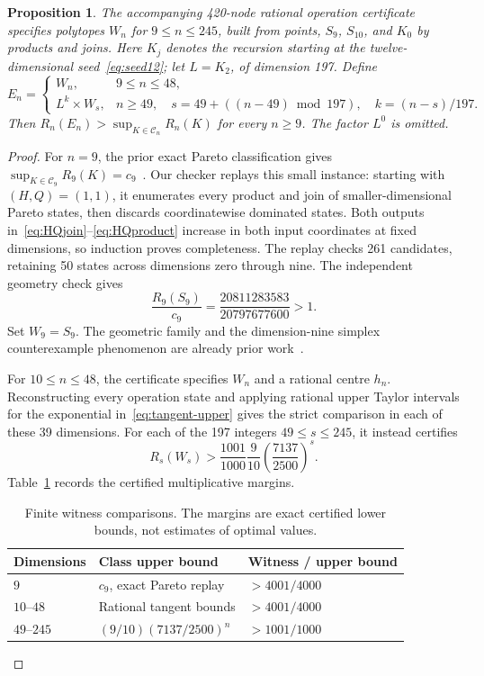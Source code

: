 \documentclass[11pt]{article}
\newtheorem{proposition}[theorem]{Proposition}
\newcommand{\CC}{\mathcal C}
\begin{document}
\begin{proposition}\label{prop:effective}
The accompanying 420-node rational operation certificate specifies
polytopes $W_n$ for $9\le n\le245$, built from points, $S_9$, $S_{10}$,
and $K_0$ by products and joins. Here $K_j$ denotes the recursion starting
at the twelve-dimensional seed~\eqref{eq:seed12}; let $L=K_2$, of
dimension 197. Define
\[
 E_n=\begin{cases}
 W_n,&9\le n\le48,\\
 L^k\times W_s,&n\ge49,\quad
 s=49+((n-49)\bmod197),\quad k=(n-s)/197.
 \end{cases}
\]
Then $R_n(E_n)>\sup_{K\in\CC_n}R_n(K)$ for every $n\ge9$.
The factor $L^0$ is omitted.
\end{proposition}
\begin{proof}
For $n=9$, the prior exact Pareto classification gives
$\sup_{K\in\CC_9}R_9(K)=c_9$~\cite[Theorem 1]{mxym-finite}.
Our checker replays this small instance: starting with $(H,Q)=(1,1)$,
it enumerates every product and join of smaller-dimensional Pareto states,
then discards coordinatewise dominated states. Both outputs
in~\eqref{eq:HQjoin}--\eqref{eq:HQproduct} increase in both input coordinates
at fixed dimensions, so induction proves completeness. The replay checks
261 candidates, retaining 50 states across dimensions zero through nine.
The independent geometry check gives
\[
 \frac{R_9(S_9)}{c_9}=\frac{20811283583}{20797677600}>1.
\]
Set $W_9=S_9$. The geometric family and the dimension-nine simplex
counterexample phenomenon are already prior work~\cite{feng}.

For $10\le n\le48$, the certificate specifies $W_n$ and a rational
centre $h_n$. Reconstructing every operation state and applying rational
upper Taylor intervals for the exponential in~\eqref{eq:tangent-upper}
gives the strict comparison in each of these 39 dimensions.
For each of the 197 integers $49\le s\le245$, it instead certifies
\[
 R_s(W_s)>\frac{1001}{1000}\frac9{10}
                    \left(\frac{7137}{2500}\right)^s.
\]
Table~\ref{tab:margins} records the certified multiplicative margins.

\begin{table}[htbp]
\centering
\caption{Finite witness comparisons. The margins are exact certified
lower bounds, not estimates of optimal values.}
\label{tab:margins}
\begin{tabular}{lll}
\toprule
Dimensions & Class upper bound & Witness / upper bound\\
\midrule
$9$ & $c_9$, exact Pareto replay & $>4001/4000$\\
$10$--$48$ & Rational tangent bounds & $>4001/4000$\\
$49$--$245$ & $(9/10)(7137/2500)^n$ & $>1001/1000$\\
\bottomrule
\end{tabular}
\end{table}


\end{proof}
\end{document}
